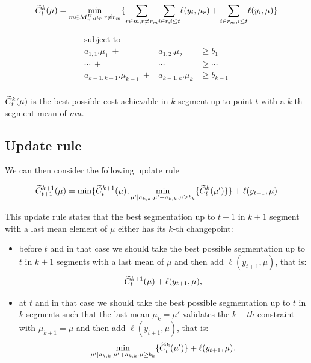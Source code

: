 \documentclass{article}
\begin{document}
\begin{equation}
\widetilde{C}^k_t(\mu) =  \underset{m \in \mathcal{M}^K_n, \mu_r |  r \neq r_m}{\min} 
		\{ 
		   \underset{r \in m, r \neq r_m}{\sum} 
		   \underset{i \in r, i \leq t  }{\sum} \ell(y_i, \mu_{r}) 
		+ 
		   \underset{i \in r_m, i \leq t}{\sum} \ell(y_i, \mu)
		\}  
\end{equation}



\begin{eqnarray*}
\text{subject to} \\
a_{1,1}. \mu_1 \ + & a_{1,2}. \mu_2  & \geq  b_1 \\
\cdots \ + & \cdots & \geq \cdots \\
a_{k-1,k-1}. \mu_{k-1} \ + &a_{k-1,k}. \mu_{k}  & \geq  b_{k-1} \\
\end{eqnarray*}

$\widetilde{C}^k_t(\mu)$ is the best possible cost achievable in $k$ segment up to point $t$ with a $k$-th
segment mean of $mu$.

\subsection{Update rule}
We can then consider the following update rule

\begin{equation}
\widetilde{C}^{k+1}_{t+1}(\mu) = \min \{ \widetilde{C}^{k+1}_{t}(\mu)  , \underset{\mu' | a_{k,k}. \mu' + a_{k,k}. \mu  \geq  b_{k}}{\min} \{ \widetilde{C}^{k}_{t}(\mu') \}  \} + \ell(y_{t+1}, \mu)
\end{equation}

This update rule states that the best segmentation up to $t+1$ in $k+1$ segment with a last mean element of $\mu$ either has its $k$-th changepoint:
\begin{itemize}
\item before $t$ and in that case we should take the best possible segmentation up to $t$ in $k+1$
segments with a last mean of $\mu$ and then add  $\ell(y_{t+1}, \mu)$, that is:
$$\widetilde{C}^{k+1}_{t}(\mu) + \ell(y_{t+1}, \mu),$$

\item at $t$ and in that case we should take the best possible segmentation up to $t$ in $k$ segments
such that the last mean $\mu_k=\mu'$ validates the $k-th$ constraint with $\mu_{k+1}=\mu$ and then add  $\ell(y_{t+1}, \mu)$, that is:
 $$\underset{\mu' | a_{k,k}. \mu' + a_{k,k}. \mu  \geq  b_{k}}{\min} \{ \widetilde{C}^{k}_{t}(\mu') \} + \ell(y_{t+1}, \mu).$$
\end{itemize}
\end{document}
